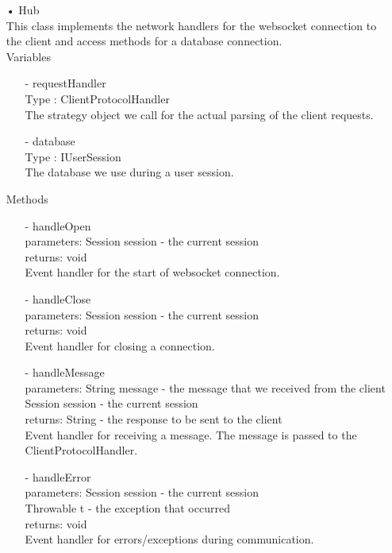 \documentclass[oneside, english, final]{design}
\begin{document}
\begin{itemize}
\item[•]Hub
		\\
		This class implements the network handlers for the websocket connection to the client and access methods for a database connection.
	      \\Variables
	      \begin{itemize}
		      \item[-]requestHandler
		            \\Type : ClientProtocolHandler
		            \\ The strategy object we call for the actual parsing of the client requests.
	      \end{itemize}
	      \begin{itemize}
		      \item[-]database
		            \\Type : IUserSession
		            \\ The database we use during a user session.
	      \end{itemize}
	      Methods
	      \begin{itemize}
		      \item[-]handleOpen
		            \\parameters: Session session - the current session
			    \\returns: void
		            \\Event handler for the start of websocket connection.
		      \item[-]handleClose
		            \\parameters: Session session - the current session
			    \\returns: void
		            \\Event handler for closing a connection.

		      \item[-]handleMessage
		            \\parameters: String message - the message that we received from the client
			    \\Session session - the current session
			    \\returns: String - the response to be sent to the client
		            \\Event handler for receiving a message. The message is passed to the ClientProtocolHandler.

		      \item[-]handleError
		            \\parameters: Session session - the current session
			    \\Throwable t - the exception that occurred
			    \\returns: void
		            \\Event handler for errors/exceptions during communication.
	      \end{itemize}



\end{itemize}
\end{document}
